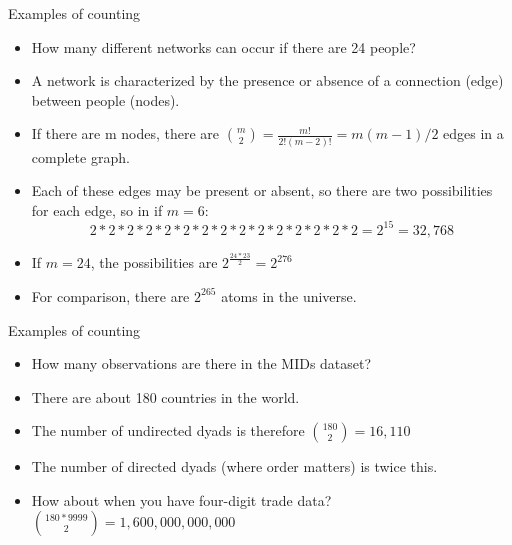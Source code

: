\documentclass[handout]{beamer}
\numberwithin{equation}{section}
\begin{document}
\begin{frame}{Examples of counting}
\begin{itemize}
\item How many different networks can occur if there are 24 people?\pause
\item A network is characterized by the presence or absence of a connection (edge) between people (nodes).\pause
\item If there are m nodes, there are ${{m}\choose{2}}=\frac{m!}{2!(m-2)!}=m(m-1)/2$ edges in a complete graph.\pause
\item Each of these edges may be present or absent, so there are two possibilities for each edge, so in if $m=6$:
$$2*2*2*2*2*2*2*2*2*2*2*2*2*2*2=2^{15}=32,768$$
\item If $m=24$, the possibilities are $2^{\frac{24*23}{2}}=2^{276}$\pause
\item For comparison, there are $2^{265}$ atoms in the universe.
\end{itemize}
\end{frame}



\begin{frame}{Examples of counting}
\begin{itemize}
\item How many observations are there in the MIDs dataset?\pause
\item There are about 180 countries in the world.
\item The number of undirected dyads is therefore ${{180}\choose{2}}=16,110$ 
\item The number of directed dyads (where order matters) is twice this.
\item How about when you have four-digit trade data? ${{180*9999}\choose{2}}=1,600,000,000,000$
\end{itemize}
\end{frame}
\end{document}
